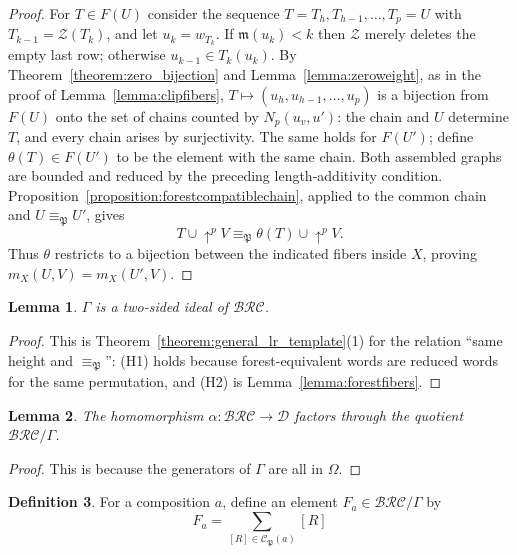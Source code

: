 \documentclass{amsart}
\newtheorem{lemma}{Lemma}[subsection]
\theoremstyle{definition}
\newtheorem{definition}[lemma]{Definition}
\theoremstyle{remark}
\numberwithin{equation}{subsection}
\newcommand{\shup}{{\uparrow}}
\newcommand{\wof}[1]{w_{#1}}
\newcommand{\zeromap}{\mathcal{Z}}
\newcommand{\BRC}{\mathcal{BRC}}
\newcommand{\dcoma}{\mathcal{D}}
\newcommand{\forest}{\mathfrak{P}}
\newcommand{\maxd}{\mathfrak{m}}
\begin{document}
\begin{proof}
For $T\in F(U)$ consider the sequence $T=T_h,T_{h-1},\ldots,T_p=U$ with $T_{k-1}=\zeromap(T_k)$, and let $u_k=\wof{T_k}$. If $\maxd(u_k)<k$ then $\zeromap$ merely deletes the empty last row; otherwise $u_{k-1}\in T_k(u_k)$. By Theorem~\ref{theorem:zero_bijection} and Lemma~\ref{lemma:zeroweight}, as in the proof of Lemma~\ref{lemma:clipfibers}, $T\mapsto(u_h,u_{h-1},\ldots,u_p)$ is a bijection from $F(U)$ onto the set of chains counted by $N_p(u_v,u')$: the chain and $U$ determine $T$, and every chain arises by surjectivity. The same holds for $F(U')$; define $\theta(T)\in F(U')$ to be the element with the same chain. Both assembled graphs are bounded and reduced by the preceding length-additivity condition. Proposition~\ref{proposition:forestcompatiblechain}, applied to the common chain and $U\equiv_\forest U'$, gives
$$T\cup\shup^pV\equiv_\forest\theta(T)\cup\shup^pV.$$
Thus $\theta$ restricts to a bijection between the indicated fibers inside $X$, proving $m_X(U,V)=m_X(U',V)$.
\end{proof}

\begin{lemma} \label{lemma:forestideal}
  $\Gamma$ is a two-sided ideal of $\BRC$.
\end{lemma}
\begin{proof}
This is Theorem~\ref{theorem:general_lr_template}(1) for the relation ``same height and $\equiv_\forest$'': (H1) holds because forest-equivalent words are reduced words for the same permutation, and (H2) is Lemma~\ref{lemma:forestfibers}.
\end{proof}

\begin{lemma}
  The homomorphism $\alpha:\BRC\to\dcoma$ factors through the quotient $\BRC/\Gamma$.
\end{lemma}
\begin{proof}
This is because the generators of $\Gamma$ are all in $\Omega$.
\end{proof}

\begin{definition}
For a composition $a$, define  an element $F_a\in\BRC/\Gamma$ by
$$F_a =\sum_{[R]\in\mathcal{C}_\forest(a)} [R]$$
\end{definition}
\end{document}
